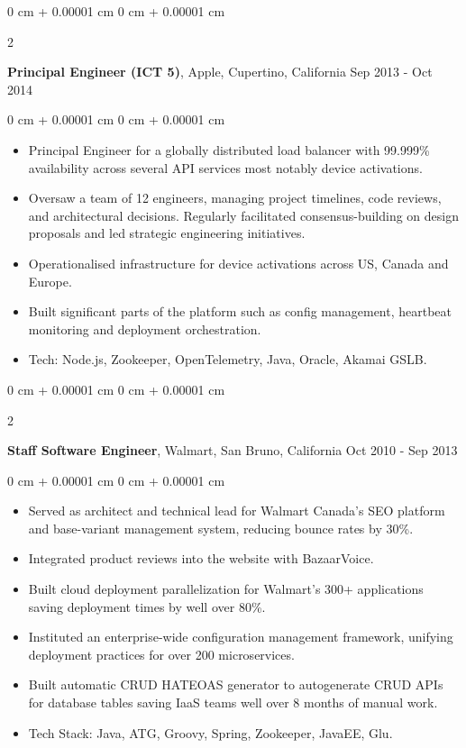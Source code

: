 \documentclass[10pt, letterpaper]{article}
\newenvironment{highlights}{
    \begin{itemize}[
        topsep=0.10 cm,
        parsep=0.10 cm,
        partopsep=0pt,
        itemsep=0pt,
        leftmargin=0 cm + 10pt
    ]
}{
    \end{itemize}
} %
\newenvironment{onecolentry}{
    \begin{adjustwidth}{
        0 cm + 0.00001 cm
    }{
        0 cm + 0.00001 cm
    }
}{
    \end{adjustwidth}
} %
\newenvironment{twocolentry}[2][]{
    \onecolentry
    \def\secondColumn{#2}
    \setcolumnwidth{\fill, 4.5 cm}
    \begin{paracol}{2}
}{
    \switchcolumn \raggedleft \secondColumn
    \end{paracol}
    \endonecolentry
} %
\begin{document}
        \vspace{0.15 cm}
        \begin{twocolentry}{
            Sep 2013 - Oct 2014
        }
            \textbf{Principal Engineer (ICT 5)}, Apple, Cupertino, California\end{twocolentry}
        \vspace{0.10 cm}
        \begin{onecolentry}
            \begin{highlights}
                \item Principal Engineer for a globally distributed load balancer with 99.999\% availability across several API services most notably device activations.
                \item Oversaw a team of 12 engineers, managing project timelines, code reviews, and architectural decisions. Regularly facilitated consensus-building on design proposals and led strategic engineering initiatives.
                \item Operationalised infrastructure for device activations across US, Canada and Europe.
                \item Built significant parts of the platform such as config management, heartbeat monitoring and deployment orchestration.
                \item Tech: Node.js, Zookeeper, OpenTelemetry, Java, Oracle, Akamai GSLB.
            \end{highlights}
        \end{onecolentry}

        \vspace{0.20 cm}
        \begin{twocolentry}{
            Oct 2010 - Sep 2013
        }
            \textbf{Staff Software Engineer}, Walmart, San Bruno, California\end{twocolentry}
        \vspace{0.10 cm}
        \begin{onecolentry}
            \begin{highlights}
                \item Served as architect and technical lead for Walmart Canada's SEO platform and base-variant management system, reducing bounce rates by 30\%.
                \item Integrated product reviews into the website with BazaarVoice.
                \item Built cloud deployment parallelization for Walmart's 300+ applications saving deployment times by well over 80\%.
                \item Instituted an enterprise-wide configuration management framework, unifying deployment practices for over 200 microservices.
                \item Built automatic CRUD HATEOAS generator to autogenerate CRUD APIs for database tables saving IaaS teams well over 8 months of manual work.
                \item Tech Stack: Java, ATG, Groovy, Spring, Zookeeper, JavaEE, Glu.
            \end{highlights}
        \end{onecolentry}
\end{document}
